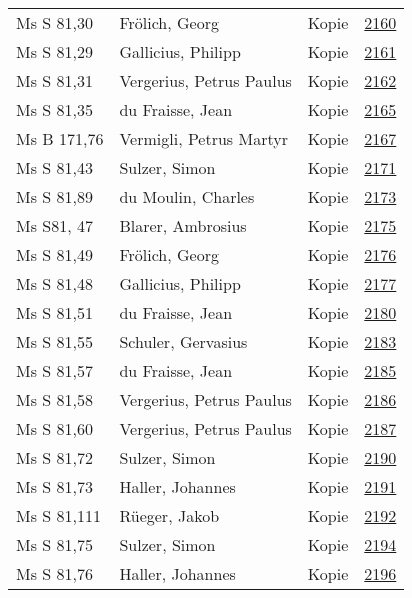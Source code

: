 \documentclass[10pt,a4paper,landscape]{report}
\begin{document}
\begin{longtable}{p{16cm}p{4cm}lr}
Ms S 81,30	&	Frölich, Georg	&	Kopie	&	\href{http://130.60.24.72/assignment/2160}{2160}\\
Ms S 81,29	&	Gallicius, Philipp	&	Kopie	&	\href{http://130.60.24.72/assignment/2161}{2161}\\
Ms S 81,31	&	Vergerius, Petrus Paulus	&	Kopie	&	\href{http://130.60.24.72/assignment/2162}{2162}\\
Ms S 81,35	&	du Fraisse, Jean	&	Kopie	&	\href{http://130.60.24.72/assignment/2165}{2165}\\
Ms B 171,76	&	Vermigli, Petrus Martyr	&	Kopie	&	\href{http://130.60.24.72/assignment/2167}{2167}\\
Ms S 81,43	&	Sulzer, Simon	&	Kopie	&	\href{http://130.60.24.72/assignment/2171}{2171}\\
Ms S 81,89	&	du Moulin, Charles	&	Kopie	&	\href{http://130.60.24.72/assignment/2173}{2173}\\
Ms S81, 47	&	Blarer, Ambrosius	&	Kopie	&	\href{http://130.60.24.72/assignment/2175}{2175}\\
Ms S 81,49	&	Frölich, Georg	&	Kopie	&	\href{http://130.60.24.72/assignment/2176}{2176}\\
Ms S 81,48	&	Gallicius, Philipp	&	Kopie	&	\href{http://130.60.24.72/assignment/2177}{2177}\\
Ms S 81,51	&	du Fraisse, Jean	&	Kopie	&	\href{http://130.60.24.72/assignment/2180}{2180}\\
Ms S 81,55	&	Schuler, Gervasius	&	Kopie	&	\href{http://130.60.24.72/assignment/2183}{2183}\\
Ms S 81,57	&	du Fraisse, Jean	&	Kopie	&	\href{http://130.60.24.72/assignment/2185}{2185}\\
Ms S 81,58	&	Vergerius, Petrus Paulus	&	Kopie	&	\href{http://130.60.24.72/assignment/2186}{2186}\\
Ms S 81,60	&	Vergerius, Petrus Paulus	&	Kopie	&	\href{http://130.60.24.72/assignment/2187}{2187}\\
Ms S 81,72	&	Sulzer, Simon	&	Kopie	&	\href{http://130.60.24.72/assignment/2190}{2190}\\
Ms S 81,73	&	Haller, Johannes	&	Kopie	&	\href{http://130.60.24.72/assignment/2191}{2191}\\
Ms S 81,111	&	Rüeger, Jakob	&	Kopie	&	\href{http://130.60.24.72/assignment/2192}{2192}\\
Ms S 81,75	&	Sulzer, Simon	&	Kopie	&	\href{http://130.60.24.72/assignment/2194}{2194}\\
Ms S 81,76	&	Haller, Johannes	&	Kopie	&	\href{http://130.60.24.72/assignment/2196}{2196}\\

\end{longtable}
\end{document}
